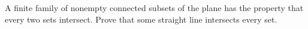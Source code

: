 A finite family of nonempty connected subsets of the plane has the property that every two sets intersect. Prove that some straight line intersects every set.
